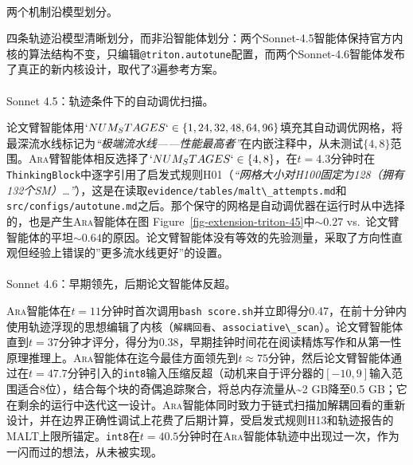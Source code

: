 \documentclass[
]{article}
\makeatletter
\let\oldparagraph\paragraph
\renewcommand{\paragraph}{
    \@ifstar
      \xxxParagraphStar
      \xxxParagraphNoStar
  }
\newcommand{\xxxParagraphStar}[1]{\oldparagraph*{#1}\mbox{}}
\newcommand{\xxxParagraphNoStar}[1]{\oldparagraph{#1}\mbox{}}
\newcommand{\passthrough}[1]{#1}
\theoremstyle{definition}
\newcommand{\ara}{\textsc{Ara}}
\makeatother
\begin{document}
\paragraph{两个机制沿模型划分。}\label{ux4e24ux4e2aux673aux5236ux6cbfux6a21ux578bux5212ux5206}

四条轨迹沿模型清晰划分，而非沿智能体划分：两个Sonnet-4.5智能体保持官方内核的算法结构不变，只编辑\passthrough{\lstinline!@triton.autotune!}配置，而两个Sonnet-4.6智能体发布了真正的新内核设计，取代了3遍参考方案。

\paragraph{Sonnet
4.5：轨迹条件下的自动调优扫描。}\label{sonnet-4.5ux8f68ux8ff9ux6761ux4ef6ux4e0bux7684ux81eaux52a8ux8c03ux4f18ux626bux63cf}

论文臂智能体用\(`NUM_STAGES` \in \{1, 24, 32, 48, 64, 96\}\)填充其自动调优网格，将最深流水线标记为\emph{``极端流水线------性能最高者''}在内嵌注释中，从未测试\(\{4, 8\}\)范围。\ara{}臂智能体相反选择了\(`NUM_STAGES` \in \{4, 8\}\)，在\(t = 4.3\)分钟时在\passthrough{\lstinline!ThinkingBlock!}中逐字引用了启发式规则H01（\emph{``网格大小对H100固定为128（拥有132个SM）\ldots{}''}），这是在读取\passthrough{\lstinline!evidence/tables/malt\_attempts.md!}和\passthrough{\lstinline!src/configs/autotune.md!}之后。那个保守的网格是自动调优器在运行时从中选择的，也是产生\ara{}智能体在图
Figure~\ref{fig-extension-triton-45}中\(\sim 0.27\)
vs.~论文臂智能体的平坦\(\sim 0.64\)的原因。论文臂智能体没有等效的先验测量，采取了方向性直观但经验上错误的''更多流水线更好''的设置。

\paragraph{Sonnet
4.6：早期领先，后期论文智能体反超。}\label{sonnet-4.6ux65e9ux671fux9886ux5148ux540eux671fux8bbaux6587ux667aux80fdux4f53ux53cdux8d85}

\ara{}智能体在\(t = 11\)分钟时首次调用\passthrough{\lstinline!bash score.sh!}并立即得分0.47，在前十分钟内使用轨迹浮现的思想编辑了内核（\passthrough{\lstinline!解耦回看!}、\passthrough{\lstinline!associative\_scan!}）。论文臂智能体直到\(t = 37\)分钟才评分，得分为0.38，早期挂钟时间花在阅读精炼写作和从第一性原理推理上。\ara{}智能体在迄今最佳方面领先到\(t \approx 75\)分钟，然后论文臂智能体通过在\(t = 47.7\)分钟引入的\passthrough{\lstinline!int8!}输入压缩反超（动机来自于评分器的\([-10, 9]\)输入范围适合8位），结合每个块的奇偶追踪聚合，将总内存流量从\textasciitilde2
GB降至0.5
GB；它在剩余的运行中迭代这一设计。\ara{}智能体同时致力于链式扫描加解耦回看的重新设计，并在边界正确性调试上花费了后期计算，受启发式规则H13和轨迹报告的MALT上限所锚定。\passthrough{\lstinline!int8!}在\(t = 40.5\)分钟时在\ara{}智能体轨迹中出现过一次，作为一闪而过的想法，从未被实现。
\end{document}
